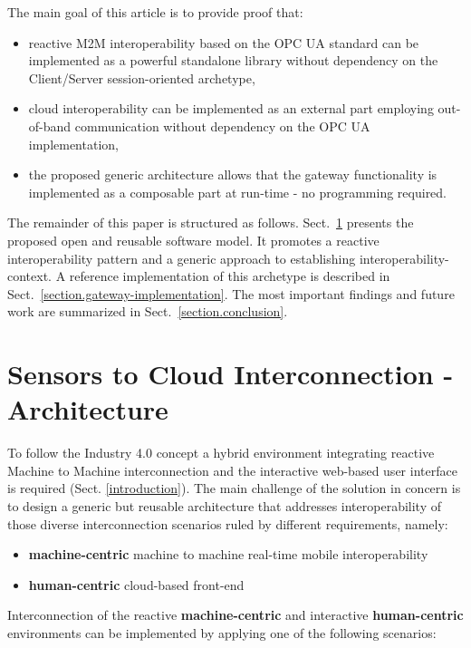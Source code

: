 \documentclass[runningheads]{llncs}
\begin{document}
The main goal of this article is to provide proof that:

\begin{itemize}
      \item reactive M2M interoperability based on the OPC UA standard can be implemented as a powerful standalone library without dependency on the Client/Server session-oriented archetype,
      \item cloud interoperability can be implemented as an external part employing out-of-band communication without dependency on the OPC UA implementation,
      \item the proposed generic architecture allows that the gateway functionality is implemented as a composable part at run-time - no programming required.
\end{itemize}

The remainder of this paper is structured as follows. Sect.~\ref{cloud-to-sensors-field-level-connectivity} presents the proposed open and reusable software model. It promotes a reactive interoperability pattern and a generic approach to establishing interoperability-context. A reference implementation of this archetype is described in Sect.~\ref{section.gateway-implementation}. The most important findings and future work are summarized in Sect.~\ref{section.conclusion}.

\section{Sensors to Cloud Interconnection - Architecture}\label{cloud-to-sensors-field-level-connectivity}

To follow the Industry 4.0 concept a hybrid environment integrating reactive Machine to Machine interconnection and the interactive web-based user interface is required (Sect. \ref{introduction}). The main challenge of the solution in concern is to design a generic but reusable architecture that addresses interoperability of those diverse interconnection scenarios ruled by different requirements, namely:

\begin{itemize}
      \item \textbf{machine-centric} machine to machine real-time mobile interoperability
      \item \textbf{human-centric} cloud-based front-end
\end{itemize}

Interconnection of the reactive \textbf{machine-centric} and interactive \textbf{human-centric} environments can be implemented by applying one of the following scenarios:
\end{document}
